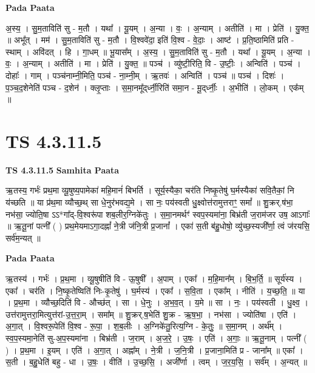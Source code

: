 \documentclass[17pt]{extarticle}
\begin{document}
\textbf{Pada Paata} \newline

अ॒स्य॒ । सु॒म॒ताविति॑ सु - म॒तौ । यथा᳚ । यू॒यम् । अ॒न्या । वः॒ । अ॒न्याम् । अतीति॑ । मा । प्रेति॑ । यु॒क्त॒ ॥ अभू᳚त् । मम॑ । सु॒म॒ताविति॑ सु - म॒तौ । वि॒श्ववे॑दा॒ इति॑ वि॒श्व - वे॒दाः॒ । आष्ट॑ । प्र॒ति॒ष्ठामिति॑ प्रति - स्थाम् । अवि॑दत् । हि । गा॒धम् ॥ भू॒यास᳚म् । अ॒स्य॒ । सु॒म॒ताविति॑ सु - म॒तौ । यथा᳚ । यू॒यम् । अ॒न्या । वः॒ । अ॒न्याम् । अतीति॑ । मा । प्रेति॑ । यु॒क्त॒ ॥ पञ्च॑ । व्यु॑ष्टी॒रिति॒ वि - उ॒ष्टीः॒ । अन्विति॑ । पञ्च॑ । दोहाः᳚ । गाम् । पञ्च॑नाम्नी॒मिति॒ पञ्च॑ - ना॒म्नी॒म् । ऋ॒तवः॑ । अन्विति॑ । पञ्च॑ ॥ पञ्च॑ । दिशः॑ । प॒ञ्च॒द॒शेनेति॑ पञ्च - द॒शेन॑ । क्लृ॒प्ताः । स॒मा॒नमू᳚द्‌र्ध्नी॒रिति॑ समा॒न - मू॒द्‌र्ध्नीः॒ । अ॒भीति॑ । लो॒कम् । एक᳚म् ॥  \newline





\section{ TS 4.3.11.5 }

\textbf{TS 4.3.11.5 } \newline
\textbf{Samhita Paata} \newline

ऋ॒तस्य॒ गर्भः॑ प्रथ॒मा व्यू॒षुष्य॒पामेका॑ महि॒मानं॑ बिभर्ति । सूर्य॒स्यैका॒ चर॑ति निष्कृ॒तेषु॑ घ॒र्मस्यैका॑ सवि॒तैकां॒ नि य॑च्छति ॥ या प्र॑थ॒मा व्यौच्छ॒थ् सा धे॒नुर॑भवद्य॒मे । सा नः॒ पय॑स्वती धु॒क्ष्वोत्त॑रामुत्तराꣳ॒॒ समां᳚ ॥ शु॒क्रर्.ष॑भा॒ नभ॑सा॒ ज्योति॒षा ऽऽ*गा᳚द्-वि॒श्वरू॑पा शब॒लीर॒ग्निके॑तुः । स॒मा॒नमर्थꣳ॑ स्वप॒स्यमा॑ना॒ बिभ्र॑ती ज॒राम॑जर उष॒ आऽगाः᳚ ॥ ऋ॒तू॒नां पत्नी᳚ ( ) प्रथ॒मेयमाऽगा॒दह्नां᳚ ने॒त्री ज॑नि॒त्री प्र॒जानां᳚ । एका॑ स॒ती ब॑हु॒धोषो॒ व्यु॑च्छ॒स्यजी᳚र्णा॒ त्वं ज॑रयसि॒ सर्व॑म॒न्यत् ॥ \newline

\textbf{Pada Paata} \newline

ऋ॒तस्य॑ । गर्भः॑ । प्र॒थ॒मा । व्यू॒षुषीति॑ वि - ऊ॒षुषी᳚ । अ॒पाम् । एका᳚ । म॒हि॒मान᳚म् । बि॒भ॒र्ति॒ ॥ सूर्य॑स्य । एका᳚ । चर॑ति । नि॒ष्कृ॒तेष्विति॑ निः-कृ॒तेषु॑ । घ॒र्मस्य॑ । एका᳚ । स॒वि॒ता । एका᳚म् । नीति॑ । य॒च्छ॒ति॒ ॥ या । प्र॒थ॒मा । व्यौच्छ॒दिति॑ वि - औच्छ॑त् । सा । धे॒नुः । अ॒भ॒व॒त् । य॒मे ॥ सा । नः॒ । पय॑स्वती । धु॒क्ष्व॒ । उत्त॑रामुत्तरा॒मित्युत्त॑रां-उ॒त्त॒रा॒म् । समा᳚म् ॥ शु॒क्रर्.ष॒भेति॑ शु॒क्र - ऋ॒ष॒भा॒ । नभ॑सा । ज्योति॑षा । एति॑ । अ॒गा॒त् । वि॒श्वरू॒पेति॑ वि॒श्व - रू॒पा॒ । श॒ब॒लीः । अ॒ग्निके॑तु॒रित्य॒ग्नि - के॒तुः॒ ॥ स॒मा॒नम् । अर्थ᳚म् । स्व॒प॒स्यमा॒नेति॑ सु-अ॒प॒स्यमा॑ना । बिभ्र॑ती । ज॒राम् । अ॒ज॒रे॒ । उ॒षः॒ । एति॑ । अ॒गाः॒ ॥ ऋ॒तू॒नाम् । पत्नी᳚ ( ) । प्र॒थ॒मा । इ॒यम् । एति॑ । अ॒गा॒त् । अह्ना᳚म् । ने॒त्री । ज॒नि॒त्री । प्र॒जाना॒मिति॑ प्र - जाना᳚म् ॥ एका᳚ । स॒ती । ब॒हु॒धेति॑ बहु - धा । उ॒षः॒ । वीति॑ । उ॒च्छ॒सि॒ । अजी᳚र्णा । त्वम् । ज॒र॒य॒सि॒ । सर्व᳚म् । अ॒न्यत् ॥  \newline
\end{document}
